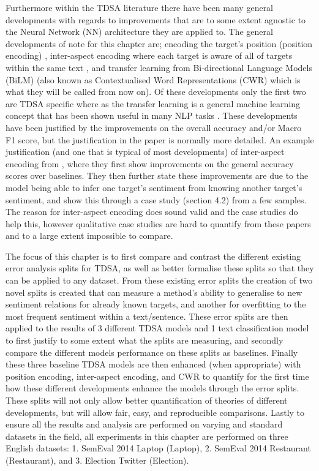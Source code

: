Furthermore within the TDSA literature there have been many general developments with regards to improvements that are to some extent agnostic to the Neural Network (NN) architecture they are applied to. The general developments of note for this chapter are; encoding the target's position (position encoding) \citep{gu-etal-2018-position}, inter-aspect encoding where each target is aware of all of targets within the same text \citep{hazarika-etal-2018-modeling}, and transfer learning from Bi-directional Language Models (BiLM) \citep{methods_sun-etal-2019-utilizing,methods_xu-etal-2019-bert} (also known as Contextualised Word Representations (CWR) which is what they will be called from now on). Of these developments only the first two are TDSA specific where as the transfer learning is a general machine learning concept that has been shown useful in many NLP tasks \citep{vectors_peters-etal-2018-deep}. These developments have been justified by the improvements on the overall accuracy and/or Macro F1 score, but the justification in the paper is normally more detailed. An example justification (and one that is typical of most developments) of inter-aspect encoding from \citet{hazarika-etal-2018-modeling}, where they first show improvements on the general accuracy scores over baselines. They then further state these improvements are due to the model being able to infer one target's sentiment from knowing another target's sentiment, and show this through a case study (section 4.2) from a few samples. The reason for inter-aspect encoding does sound valid and the case studies do help this, however qualitative case studies are hard to quantify from these papers and to a large extent impossible to compare.

The focus of this chapter is to first compare and contrast the different existing error analysis splits for TDSA, as well as better formalise these splits so that they can be applied to any dataset. From these existing error splits the creation of two novel splits is created that can measure a method's ability to generalise to new sentiment relations for already known targets, and another for overfitting to the most frequent sentiment within a text/sentence. These error splits are then applied to the results of 3 different TDSA models and 1 text classification model to first justify to some extent what the splits are measuring, and secondly compare the different models performance on these splits as baselines. Finally these three baseline TDSA models are then enhanced (when appropriate) with position encoding, inter-aspect encoding, and CWR to quantify for the first time how these different developments enhance the models through the error splits. These splits will not only allow better quantification of theories of different developments, but will allow fair, easy, and reproducible comparisons. Lastly to ensure all the results and analysis are performed on varying and standard datasets in the field, all experiments in this chapter are performed on three English datasets: 1. SemEval 2014 Laptop \citep{aug_pontiki-etal-2014-semeval} (Laptop), 2. SemEval 2014 Restaurant \citep{aug_pontiki-etal-2014-semeval} (Restaurant), and 3. Election Twitter \citep{aug_wang_2017} (Election). 

